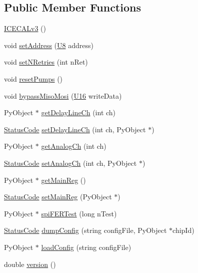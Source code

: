 \subsection*{Public Member Functions}
\begin{DoxyCompactItemize}
\item 
\hyperlink{classICECALv3_a0a8b12d2b6bafca9cd820301fc93dff8}{ICECALv3} ()
\item 
void \hyperlink{classICECALv3_aaf38119f47401a85022ae1b0d05675bd}{setAddress} (\hyperlink{LSDelayChipV1_8h_a3cb25ca6f51f003950f9625ff05536fc}{U8} address)
\item 
void \hyperlink{classICECALv3_aae0b7539c0bba5311aab99e000d1be6d}{setNRetries} (int nRet)
\item 
void \hyperlink{classICECALv3_a1b9ca0e09d45634a70da6f19a7257314}{resetPumps} ()
\item 
void \hyperlink{classICECALv3_a5ce36881aa89fedf7c37e03620acca6e}{bypassMisoMosi} (\hyperlink{LSDelayChipV1_8h_adf928e51a60dba0df29d615401cc55a8}{U16} writeData)
\item 
PyObject $\ast$ \hyperlink{classICECALv3_a7a1c1706a455903f42bb9a5257d94a78}{getDelayLineCh} (int ch)
\item 
\hyperlink{classStatusCode}{StatusCode} \hyperlink{classICECALv3_a14a7a29c9a3412c062f053cc616b860a}{setDelayLineCh} (int ch, PyObject $\ast$)
\item 
PyObject $\ast$ \hyperlink{classICECALv3_a5f1414e6049a82eafdd505a88d7d0c91}{getAnalogCh} (int ch)
\item 
\hyperlink{classStatusCode}{StatusCode} \hyperlink{classICECALv3_a9578e4d13c250d8bc417f68c79d6a21d}{setAnalogCh} (int ch, PyObject $\ast$)
\item 
PyObject $\ast$ \hyperlink{classICECALv3_a4a414d23c1e199b446dc876161338148}{getMainReg} ()
\item 
\hyperlink{classStatusCode}{StatusCode} \hyperlink{classICECALv3_a479f7e17669da4b785af840049d39cb4}{setMainReg} (PyObject $\ast$)
\item 
PyObject $\ast$ \hyperlink{classICECALv3_a8639cf6a44cba85b53128b5e1dc21e15}{spiFERTest} (long nTest)
\item 
\hyperlink{classStatusCode}{StatusCode} \hyperlink{classICECALv3_ac26be912fb72e615106fceb4626aa548}{dumpConfig} (string configFile, PyObject $\ast$chipId)
\item 
PyObject $\ast$ \hyperlink{classICECALv3_a514456dd303e897aa1b55dccf3fa66d0}{loadConfig} (string configFile)
\item 
double \hyperlink{classICECALv3_a7f3f8012d2e5c45f8e43819befa3f915}{version} ()

\end{DoxyCompactItemize}
